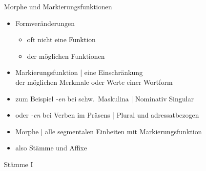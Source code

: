 \begin{frame}
  {Morphe und Markierungsfunktionen}
  \pause
  \begin{itemize}[<+->]
    \item Formveränderungen
      \begin{itemize}[<+->]
        \item oft nicht \alert{eine} Funktion
        \item {} der möglichen Funktionen
      \end{itemize}
   \Halbzeile 
    \item \alert{Markierungsfunktion} | eine \alert{Einschränkung}\\
      der möglichen Merkmale oder Werte einer Wortform
    \item zum Beispiel \textit{-en} bei schw.\ Maskulina |  Nominativ Singular
    \item oder \textit{-en} bei Verben im Präsens | Plural und  adressatbezogen
      \Halbzeile
    \item \alert{Morphe | alle segmentalen Einheiten mit Markierungsfunktion}
    \item also \alert{Stämme} und \alert{Affixe}
  \end{itemize}
\end{frame}

\begin{frame}
  {Stämme I}
  \pause
  \begin{exe}
    \ex
    \begin{xlist}
        \pause
        \pause
    \end{xlist}
  \end{exe}
\end{frame}

